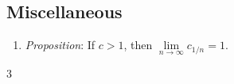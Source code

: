 \message{ !name(cheatsheet.tex)}\documentclass{article}
\newcommand{\ntoinf}{\limits_{n\rightarrow\infty}}
\newcommand{\limn}[1]{\lim\ntoinf #1}
\begin{document}
\begin{multicols*}{3}
	\section{Miscellaneous}
	\begin{enumerate}
		\item \emph{Proposition}: If $c>1$, then $\limn{c_{1/n}}=1$.
	\end{enumerate}
\end{multicols*}{3}
\end{document}
